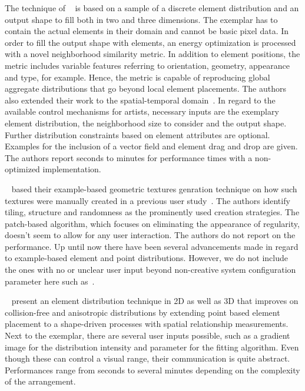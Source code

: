 The technique of \citeauthor*{ma_2011_det}~\cite{ma_2011_det} is based on a sample of a discrete element distribution and an output shape to fill both in two and three dimensions. The exemplar has to contain the actual elements in their domain and cannot be basic pixel data. In order to fill the output shape with elements, an energy optimization is processed with a novel neighborhood similarity metric. In addition to element positions, the metric includes  variable features referring to orientation, geometry, appearance and type, for example. Hence, the metric is capable of reproducing global aggregate distributions that go beyond local element placements. The authors also extended their work to the spatial-temporal domain~\cite{ma_2013_det}. In regard to the available control mechanisms for artists, necessary inputs are the exemplary element distribution, the neighborhood size to consider and the output shape. Further distribution constraints based on element attributes are optional. Examples for the inclusion of a vector field and element drag and drop are given. The authors report seconds to minutes for performance times with a non-optimized implementation.

\citeauthor*{almeraj_2013_pgt}~\cite{almeraj_2013_pgt} based their example-based geometric textures genration technique  on how such textures were manually created in a previous user study~\cite{almeraj_2011_tgt}. The authors identify tiling, structure and randomness as the prominently used creation strategies. The patch-based algorithm, which focuses on eliminating the appearance of regularity, doesn't seem to allow for any user interaction. The authors do not report on the performance. Up until now there have been several advancements made in regard to example-based element and point distributions. However, we do not include the ones with no or unclear user input beyond non-creative system configuration parameter here such as~\cite{peihan_2019_pps, chen_2019_mpc}.


\citeauthor*{landes_2013_asm}~\cite{landes_2013_asm} present an element distribution technique in 2D as well as 3D that improves on collision-free and anisotropic distributions by extending point based element placement to a shape-driven processes with spatial relationship measurements. Next to the exemplar, there are several user inputs possible, such as a gradient image for the distribution intensity and parameter for the fitting algorithm. Even though these can control a visual range, their communication is quite abstract. Performances range from seconds to several minutes depending on the complexity of the arrangement. 


